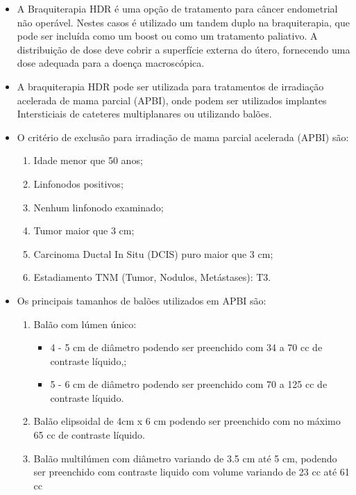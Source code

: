\documentclass[11pt,a4paper]{article}
\newcounter{exemplo}
\begin{document}
\begin{exemplo}[Braquiterapia]
\begin{itemize}
        \item A Braquiterapia HDR é uma opção de tratamento para câncer endometrial não operável. Nestes casos é utilizado um tandem duplo na braquiterapia, que pode ser incluída como um boost ou como um tratamento paliativo. A distribuição de dose deve cobrir a superfície externa do útero, fornecendo uma dose adequada para a doença macroscópica.
        
        \item A braquiterapia HDR pode ser utilizada para tratamentos de irradiação acelerada de mama parcial (APBI), onde podem ser utilizados implantes Intersticiais de cateteres multiplanares ou utilizando balões. 
        
        \item O critério de exclusão para irradiação de mama parcial acelerada (APBI) são:
        
            \begin{enumerate}[label=\textcolor{CarnationPink}{\roman*.}]
                \item Idade menor que 50 anos;
                \item Linfonodos positivos;
                \item Nenhum linfonodo examinado;
                \item Tumor maior que 3 cm;
                \item Carcinoma Ductal In Situ (DCIS) puro maior que 3 cm;
                \item Estadiamento TNM (Tumor, Nodulos, Metástases): T3.
            \end{enumerate}


        \item Os principais tamanhos de balões utilizados em APBI são:
        
            \begin{enumerate}
                \item Balão com lúmen único:
                    \begin{itemize}
                        \item 4 - 5 cm de diâmetro podendo ser preenchido com 34 a 70 cc de contraste líquido,;
                        \item 5 - 6 cm de diâmetro podendo ser preenchido com 70 a 125 cc de contraste líquido.
                    \end{itemize}
                \item Balão elipsoidal de 4cm x 6 cm podendo ser preenchido com no máximo 65 cc de contraste líquido.
                \item Balão multilúmen com diâmetro variando de 3.5 cm até 5 cm, podendo ser preenchido com contraste liquido com volume variando de 23 cc até 61 cc
            \end{enumerate}


\end{itemize}
\end{exemplo}
\end{document}
